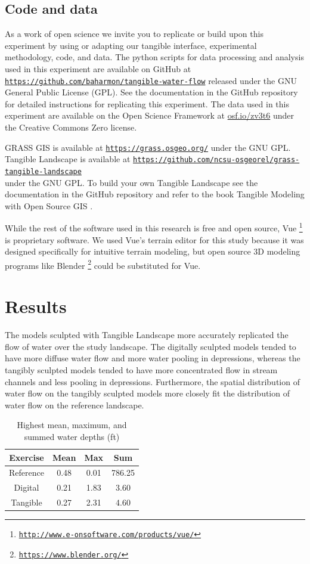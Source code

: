 \documentclass{isprs}
\newcommand{\urlhttp}[1]{\href{http://#1}{\nolinkurl{#1}}}
\newcommand{\urlhttps}[1]{\href{https://#1}{\nolinkurl{#1}}}
\begin{document}
\subsection{Code and data}

As a work of open science we invite you to
replicate or build upon this experiment by 
using or adapting our tangible interface, experimental methodology, code, and data. 
%
The python scripts for data processing and analysis used in this experiment 
are available on GitHub at 
\urlhttps{https://github.com/baharmon/tangible-water-flow}
released under the GNU General Public License (GPL). 
%
See the documentation in the GitHub repository for detailed instructions for replicating this experiment. 
%
The data used in this experiment are available on the Open Science Framework at \url{osf.io/zv3t6} under the Creative Commons Zero license.

GRASS GIS is available at
\urlhttps{https://grass.osgeo.org/} 
under the GNU GPL. 
%
Tangible Landscape is available at
\urlhttps{https://github.com/ncsu-osgeorel/grass-tangible-landscape} \\
under the GNU GPL. 
%
To build your own Tangible Landscape
see the documentation in the GitHub repository 
and refer to the book Tangible Modeling with Open Source GIS \cite{Petrasova2015}.

While the rest of the software used in this research is free and open source, 
Vue \footnote{\urlhttp{http://www.e-onsoftware.com/products/vue/}} is proprietary software. 
We used Vue's terrain editor for this study because it was designed specifically for intuitive terrain modeling, but 
open source 3D modeling programs like Blender \footnote{\urlhttps{https://www.blender.org/}} could be substituted for Vue. 
%

\section{Results}\label{sec:results}
%
The models sculpted with Tangible Landscape more accurately replicated the flow of water over the study landscape. 
%
The digitally sculpted models tended to have 
more diffuse water flow
and more water pooling in depressions, whereas 
%
the tangibly sculpted models tended to have 
more concentrated flow in stream channels
and less pooling in depressions.
%
Furthermore, 
the spatial distribution of water flow on the tangibly sculpted models 
more closely fit the distribution of water flow on the reference landscape. 

\begin{table}[h!]
\caption{Highest mean, maximum, and summed water depths (ft)}
\vspace*{0.5em}
\centering
\begin{tabular}{c c c c}
\toprule
Exercise & Mean & Max & Sum\\
\midrule
Reference & 0.48 & 0.01 & 786.25\\
Digital & 0.21 & 1.83 & 3.60\\
Tangible & 0.27 & 2.31 & 4.60\\ 
\bottomrule
\end{tabular}
\label{table:water_depth} 
\end{table}
\end{document}
